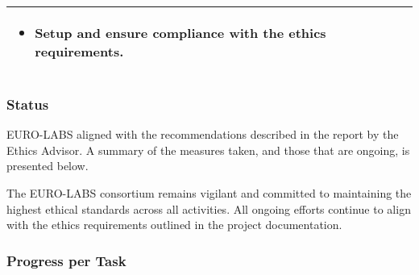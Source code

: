 \begin{table}[H]
\begin{tabular}{|p{}|}
        \hspace*{-0.75cm} 
        \begin{minipage}[t]{\textwidth}
    		\begin{itemize}
    		    \item Setup and ensure compliance with the ethics requirements.
    		\end{itemize} 
    		\vspace*{0.10em}
		\end{minipage}        
        \\
        \hline
    \end{tabular}
    \vspace{0.5em}\vfill
\end{table}


\subsubsection*{Status}

EURO-LABS aligned with the recommendations described in the report by the  Ethics Advisor.
 A summary of the measures taken, and those that are ongoing, is presented below. 


The EURO-LABS consortium remains vigilant and committed to maintaining the highest ethical standards across all activities. All ongoing efforts continue to align with the ethics requirements outlined in the project documentation.

\subsubsection*{Progress per Task}

